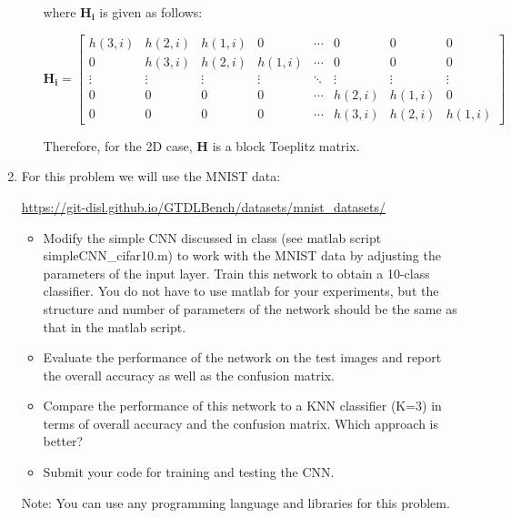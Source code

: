 \documentclass[fleqn]{article}
\begin{document}
\begin{enumerate}
\begin{enumerate}
			where $\mathbf{H_i}$ is given as follows:
			
			\begin{equation*}
				\mathbf{H_i} = \begin{bmatrix}
					h(3,i) & h(2,i) & h(1,i) & 0      & \cdots & 0      & 0      & 0 \\
					0      & h(3,i) & h(2,i) & h(1,i) & \cdots & 0      & 0      & 0 \\
					\vdots & \vdots & \vdots & \vdots & \ddots & \vdots & \vdots & \vdots \\
					0      & 0      & 0      & 0      & \cdots & h(2,i) & h(1,i) & 0 \\
					0      & 0      & 0      & 0      & \cdots & h(3,i) & h(2,i) & h(1,i)
				\end{bmatrix}
			\end{equation*}
			
			Therefore, for the 2D case, $\mathbf{H}$ is a block Toeplitz matrix.
		\end{enumerate}
		
		\item For this problem we will use the MNIST data:
		
		\href{https://git-disl.github.io/GTDLBench/datasets/mnist\_datasets/}{https://git-disl.github.io/GTDLBench/datasets/mnist\_datasets/}
		
		\begin{itemize}
			\item Modify the simple CNN discussed in class (see matlab script \newline simpleCNN\_cifar10.m) to work with the MNIST data by adjusting the parameters of the input layer. Train this network to obtain a 10-class classifier. You do not have to use matlab for your experiments, but the structure and number of parameters of the network should be the same as that in the matlab script.
			
			\item Evaluate the performance of the network on the test images and report the overall accuracy as well as the confusion matrix.
			
			\item Compare the performance of this network to a KNN classifier (K=3) in terms of overall accuracy and the confusion matrix. Which approach is better?
			
			\item Submit your code for training and testing the CNN.
			
		\end{itemize}
		
		Note: You can use any programming language and libraries for this \newline problem.
	\end{enumerate}
\end{document}
